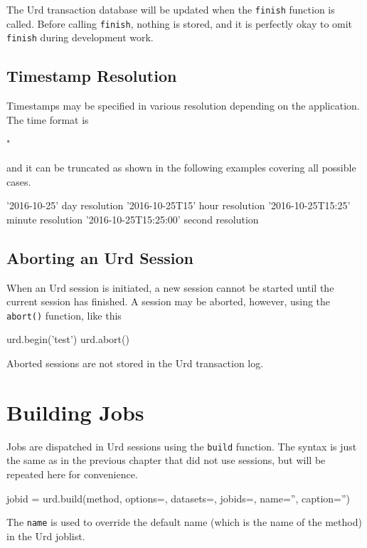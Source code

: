 The Urd transaction database will be updated when the \texttt{finish}
function is called.  Before calling \texttt{finish}, nothing is
stored, and it is perfectly okay to omit \texttt{finish} during
development work.




\subsection{Timestamp Resolution}

Timestamps may be specified in various resolution depending on the
application.  The time format is
\begin{python}
"%
\end{python}
and it can be truncated as shown in the following examples covering
all possible cases.
\begin{python}
'2016-10-25'               day resolution
'2016-10-25T15'            hour resolution
'2016-10-25T15:25'         minute resolution
'2016-10-25T15:25:00'      second resolution
\end{python}



\subsection{Aborting an Urd Session}

When an Urd session is initiated, a new session cannot be started
until the current session has finished.  A session may be aborted,
however, using the \texttt{abort()} function, like this
\begin{python}
urd.begin('test')
urd.abort()
\end{python}
Aborted sessions are not stored in the Urd transaction log.




\section{Building Jobs}

Jobs are dispatched in Urd sessions using the \texttt{build} function.
The syntax is just the same as in the previous chapter that did not
use sessions, but will be repeated here for convenience.\\[-3ex]
\begin{python}
jobid = urd.build(method, options={}, datasets={}, jobids={}, name='', caption='')
\end{python}
The \texttt{name} is used to override the default name (which is the name of the method) in the Urd joblist.



